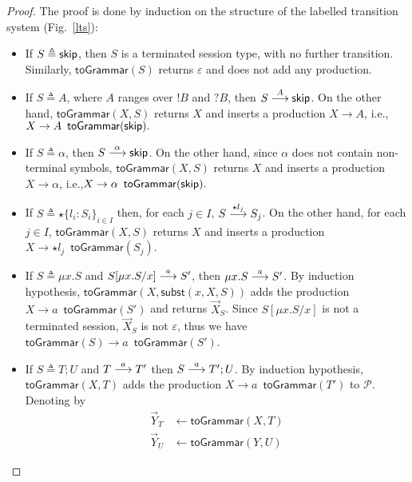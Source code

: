 \begin{proof}
The proof is done by induction on the structure of the labelled 
transition system (Fig.~\ref{lts}):
\begin{itemize}
	\item If $S\triangleq \skipk$, then $S$ is a terminated 
	      session type, with no further transition. Similarly, 
	      $\mathsf{toGrammar}(S)$ returns $\varepsilon$ and 
	      does not add any production.
	\item If $S\triangleq A$, where $A$ ranges over $!B$ and $?B$, 
	      then $S  \LTSderives[A] \skipk$. On the other hand, 
	      $\mathsf{toGrammar}(X,S)$ returns $X$ and inserts a production $X\rightarrow A$, 
	      i.e., $X\rightarrow A \enspace  \mathsf{toGrammar}(\skipk).$  
	\item If $S \triangleq \alpha$, then $S   \LTSderives[\alpha] \skipk$. 
	      On the other hand, since $\alpha$ does not contain non-terminal 
	      symbols, $\mathsf{toGrammar}(X,S)$ returns $X$ and inserts a production 
	      $X\rightarrow \alpha$, i.e.,\linebreak  $X\rightarrow \alpha \enspace 
	      \mathsf{toGrammar}(\skipk).$
	\item If $S\triangleq \star\{l_i\colon S_i\}_{i\in I}$ then, for each 
          $j\in I$, $S \LTSderives[\star l_j] S_j$. On the other hand, 
          for each $j\in I$, $\mathsf{toGrammar}(X,S)$ returns $X$ and  inserts a production 
          $X\rightarrow \star l_j \enspace \mathsf{toGrammar}(S_j)$.
	\item If $S\triangleq \mu x.S$ and $S[\mu x.S/x] \LTSderives[a] S'$, 
	      then $\mu x.S \LTSderives[a] S'$. By induction hypothesis, 
	      $\mathsf{toGrammar}(X,\mathsf{subst}(x,X,S))$ adds the production 
	      $X \rightarrow a\enspace  \mathsf{toGrammar}(S')$ and returns $\vec X_S$.
	      Since $S[\mu x.S/x]$ is not a terminated session, $\vec X_S$ is not $\varepsilon$, 
	      thus we have \linebreak$\mathsf{toGrammar}(S) \rightarrow a\enspace  \mathsf{toGrammar}(S')$.
	\item If $S\triangleq T;U$ and $T \LTSderives[a] T'$ then $S \LTSderives[a] T';U$. 
	      By induction hypothesis, $\mathsf{toGrammar}(X,T)$ adds the production 
	      $X\rightarrow a \enspace \mathsf{toGrammar}(T')$ to $\mathcal P$.
		Denoting by 
		\begin{align*}
			\vec Y_T &\leftarrow \mathsf{toGrammar}(X,T)\\
			\vec Y_U &\leftarrow \mathsf{toGrammar}(Y,U)

\end{align*}
\end{itemize}
\end{proof}

